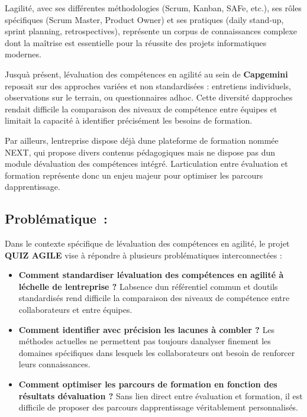 \documentclass[12pt,a4paper,twoside]{report}
\begin{document}
L\textquotesingle agilité, avec ses différentes méthodologies (Scrum,
Kanban, SAFe, etc.), ses rôles spécifiques (Scrum Master, Product Owner)
et ses pratiques (daily stand-up, sprint planning, retrospectives),
représente un corpus de connaissances complexe dont la maîtrise est
essentielle pour la réussite des projets informatiques modernes.

Jusqu\textquotesingle à présent, l\textquotesingle évaluation des
compétences en agilité au sein de \textbf{Capgemini} reposait sur des
approches variées et non standardisées : entretiens individuels,
observations sur le terrain, ou questionnaires adhoc. Cette diversité
d\textquotesingle approches rendait difficile la comparaison des niveaux
de compétence entre équipes et limitait la capacité à identifier
précisément les besoins de formation.

Par ailleurs, l\textquotesingle entreprise dispose déjà
d\textquotesingle une plateforme de formation nommée NEXT, qui propose
divers contenus pédagogiques mais ne dispose pas d\textquotesingle un
module d\textquotesingle évaluation des compétences intégré.
L\textquotesingle articulation entre évaluation et formation représente
donc un enjeu majeur pour optimiser les parcours
d\textquotesingle apprentissage.

\hypertarget{probluxe9matique}{%
\subsection{Problématique~:}\label{probluxe9matique}}

Dans le contexte spécifique de l\textquotesingle évaluation des
compétences en agilité, le projet \textbf{QUIZ AGILE} vise à répondre à
plusieurs problématiques interconnectées :

\begin{itemize}
\item
  \textbf{Comment standardiser l\textquotesingle évaluation des
  compétences en agilité à l\textquotesingle échelle de
  l\textquotesingle entreprise ?} L\textquotesingle absence
  d\textquotesingle un référentiel commun et d\textquotesingle outils
  standardisés rend difficile la comparaison des niveaux de compétence
  entre collaborateurs et entre équipes.
\item
  \textbf{Comment identifier avec précision les lacunes à combler ?} Les
  méthodes actuelles ne permettent pas toujours
  d\textquotesingle analyser finement les domaines spécifiques dans
  lesquels les collaborateurs ont besoin de renforcer leurs
  connaissances.
\item
  \textbf{Comment optimiser les parcours de formation en fonction des
  résultats d\textquotesingle évaluation ?} Sans lien direct entre
  évaluation et formation, il est difficile de proposer des parcours
  d\textquotesingle apprentissage véritablement personnalisés.
\end{itemize}
\end{document}
